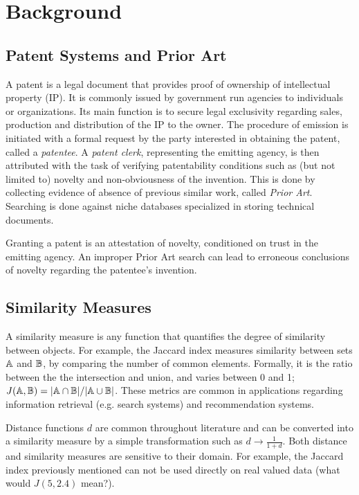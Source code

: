 \documentclass[conference]{IEEEtran}
\begin{document}
\section{Background}
\subsection{Patent Systems and Prior Art}
A patent is a legal document that provides proof of ownership of intellectual property (IP). It is commonly issued by government run agencies to individuals or organizations. Its main function is to secure legal exclusivity regarding sales, production and distribution of the IP to the owner. The procedure of emission is initiated with a formal request by the party interested in obtaining the patent, called a \emph{patentee}. A \emph{patent clerk}, representing the emitting agency, is then attributed with the task of verifying patentability conditions such as (but not limited to) novelty and non-obviousness of the invention. This is done by collecting evidence of absence of previous similar work, called \emph{Prior Art}. Searching is done against niche databases specialized in storing technical documents.

Granting a patent is an attestation of novelty, conditioned on trust in the emitting agency. An improper Prior Art search can lead to erroneous conclusions of novelty regarding the patentee's invention. 

\subsection{Similarity Measures}
A similarity measure is any function that quantifies the degree of similarity between objects. For example, the Jaccard index measures similarity between sets ${\mathbb{A}}$ and ${\mathbb{B}}$, by comparing the number of common elements. Formally, it is the ratio between the the intersection and union, and varies between 0 and 1; $J({\mathbb{A}}, {\mathbb{B}}) = \vert{\mathbb{A}}\cap{\mathbb{B}}\vert/\vert{\mathbb{A}}\cup{\mathbb{B}}\vert$. These metrics are common in applications regarding information retrieval (e.g. search systems) and recommendation systems.

Distance functions $d$ are common throughout literature and can be converted into a similarity measure by a simple transformation such as $d \to \frac{1}{1+d}$. Both distance and similarity measures are sensitive to their domain. For example, the Jaccard index previously mentioned can not be used directly on real valued data (what would $J(5, 2.4)$ mean?).
\end{document}
